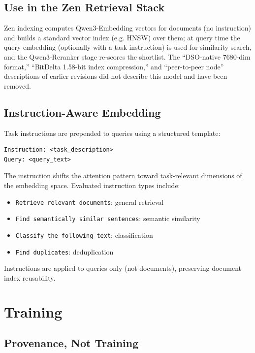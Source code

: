 \documentclass[11pt,a4paper]{article}
\begin{document}
\subsection{Use in the Zen Retrieval Stack}

Zen indexing computes Qwen3-Embedding vectors for documents (no instruction) and builds a
standard vector index (e.g. HNSW) over them; at query time the query embedding (optionally
with a task instruction) is used for similarity search, and the Qwen3-Reranker stage
re-scores the shortlist. The ``DSO-native 7680-dim format,'' ``BitDelta 1.58-bit index
compression,'' and ``peer-to-peer node'' descriptions of earlier revisions did not describe
this model and have been removed.

\subsection{Instruction-Aware Embedding}

Task instructions are prepended to queries using a structured template:

\begin{verbatim}
Instruction: <task_description>
Query: <query_text>
\end{verbatim}

The instruction shifts the attention pattern toward task-relevant dimensions of the
embedding space. Evaluated instruction types include:
\begin{itemize}
\item \texttt{Retrieve relevant documents}: general retrieval
\item \texttt{Find semantically similar sentences}: semantic similarity
\item \texttt{Classify the following text}: classification
\item \texttt{Find duplicates}: deduplication
\end{itemize}

Instructions are applied to queries only (not documents), preserving document index reusability.

\section{Training}
\label{sec:training}

\subsection{Provenance, Not Training}
\end{document}

